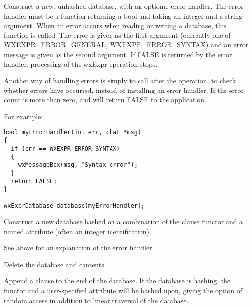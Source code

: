 Construct a new, unhashed database, with an optional error handler. The
error handler must be a function returning a bool and taking an integer and a string
argument. When an error occurs when reading or writing a database, this function is
called. The error is given as the first argument (currently one of WXEXPR\_ERROR\_GENERAL,
WXEXPR\_ERROR\_SYNTAX) and an error message is given as the second argument. If FALSE
is returned by the error handler, processing of the wxExpr operation stops.

Another way of handling errors is simply to call  after
the operation, to check whether errors have occurred, instead of installing an error handler.
If the error count is more than zero,  and
\rtfsp{} will return FALSE to
the application.

For example:

\begin{verbatim}
bool myErrorHandler(int err, chat *msg)
{
  if (err == WXEXPR_ERROR_SYNTAX)
  {
    wxMessageBox(msg, "Syntax error");
  }
  return FALSE;
}

wxExprDatabase database(myErrorHandler);
\end{verbatim}



Construct a new database hashed on a combination of the clause functor and
a named attribute (often an integer identification).

See above for an explanation of the error handler.



Delete the database and contents.

\label{wxexprdatabaseappend}


Append a clause to the end of the database. If the database is hashing,
the functor and a user-specified attribute will be hashed upon, giving the
option of random access in addition to linear traversal of the database.

\label{wxexprdatabasebeginfind}

